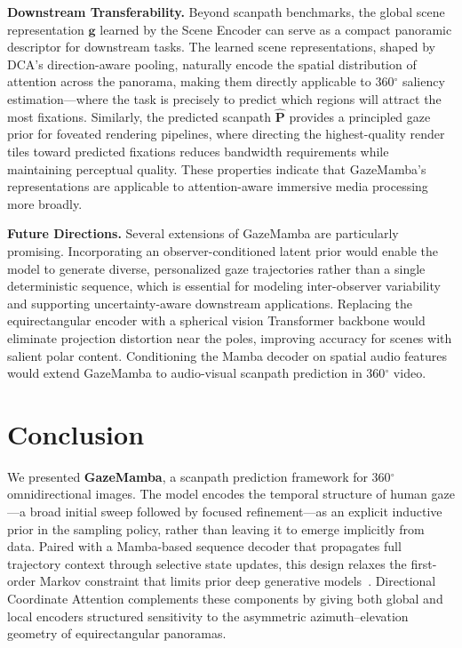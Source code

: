 \documentclass[sigconf]{acmart}
\begin{document}
\textbf{Downstream Transferability.}
Beyond scanpath benchmarks, the global scene representation $\mathbf{g}$ learned by the Scene Encoder can serve as a compact panoramic descriptor for downstream tasks. The learned scene representations, shaped by DCA's direction-aware pooling, naturally encode the spatial distribution of attention across the panorama, making them directly applicable to 360$^\circ$ saliency estimation—where the task is precisely to predict which regions will attract the most fixations. Similarly, the predicted scanpath $\hat{\mathbf{P}}$ provides a principled gaze prior for foveated rendering pipelines, where directing the highest-quality render tiles toward predicted fixations reduces bandwidth requirements while maintaining perceptual quality. These properties indicate that GazeMamba's representations are applicable to attention-aware immersive media processing more broadly.

\textbf{Future Directions.}
Several extensions of GazeMamba are particularly promising. Incorporating an observer-conditioned latent prior would enable the model to generate diverse, personalized gaze trajectories rather than a single deterministic sequence, which is essential for modeling inter-observer variability and supporting uncertainty-aware downstream applications. Replacing the equirectangular encoder with a spherical vision Transformer backbone would eliminate projection distortion near the poles, improving accuracy for scenes with salient polar content. Conditioning the Mamba decoder on spatial audio features would extend GazeMamba to audio-visual scanpath prediction in 360$^\circ$ video.

\section{Conclusion}

We presented \textbf{GazeMamba}, a scanpath prediction framework for 360$^\circ$ omnidirectional images. The model encodes the temporal structure of human gaze—a broad initial sweep followed by focused refinement—as an explicit inductive prior in the sampling policy, rather than leaving it to emerge implicitly from data. Paired with a Mamba-based sequence decoder that propagates full trajectory context through selective state updates, this design relaxes the first-order Markov constraint that limits prior deep generative models~\cite{sui2023scandmm}. Directional Coordinate Attention complements these components by giving both global and local encoders structured sensitivity to the asymmetric azimuth–elevation geometry of equirectangular panoramas.
\end{document}
